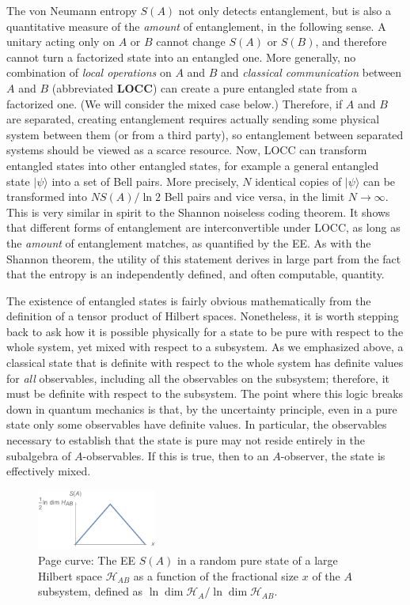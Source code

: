 \documentclass[11pt]{article}
\newcommand{\ket}[1]{|{#1}\rangle}
\newcommand{\HH}{\mathcal{H}}
\begin{document}
The von Neumann entropy $S(A)$ not only detects entanglement, but is also a quantitative measure of the \emph{amount} of entanglement, in the following sense. A unitary acting only on $A$ or $B$ cannot change $S(A)$ or $S(B)$, and therefore cannot turn a factorized state into an entangled one. More generally, no combination of \emph{local operations} on $A$ and $B$ and \emph{classical communication} between $A$ and $B$ (abbreviated \textbf{LOCC}) can create a pure entangled state from a factorized one. (We will consider the mixed case below.) Therefore, if $A$ and $B$ are separated, creating entanglement requires actually sending some physical system between them (or from a third party), so entanglement between separated systems should be viewed as a scarce resource. Now, LOCC can transform entangled states into other entangled states, for example a general entangled state $\ket{\psi}$ into a set of Bell pairs. More precisely, $N$ identical copies of $\ket{\psi}$ can be transformed into $NS(A)/\ln2$ Bell pairs and vice versa, in the limit $N\to\infty$. This is very similar in spirit to the Shannon noiseless coding theorem. It shows that different forms of entanglement are interconvertible under LOCC, as long as the \emph{amount} of entanglement matches, as quantified by the EE. As with the Shannon theorem, the utility of this statement derives in large part from the fact that the entropy is an independently defined, and often computable, quantity.

The existence of entangled states is fairly obvious mathematically from the definition of a tensor product of Hilbert spaces. Nonetheless, it is worth stepping back to ask how it is possible physically for a state to be pure with respect to the whole system, yet mixed with respect to a subsystem. As we emphasized above, a classical state that is definite with respect to the whole system has definite values for \emph{all} observables, including all the observables on the subsystem; therefore, it must be definite with respect to the subsystem. The point where this logic breaks down in quantum mechanics is that, by the uncertainty principle, even in a pure state only some observables have definite values. In particular, the observables necessary to establish that the state is pure may not reside entirely in the subalgebra of $A$-observables. If this is true, then to an $A$-observer, the state is effectively mixed.

\begin{figure}[tbp]
\centering
\includegraphics[width=0.35\textwidth]{figs/Page.pdf}
\caption{\label{fig:Page}
Page curve: The EE $S(A)$ in a random pure state of a large Hilbert space $\HH_{AB}$ as a function of the fractional size $x$ of the $A$ subsystem, defined as $\ln\dim\HH_A/\ln\dim\HH_{AB}$.
}
\end{figure}
\end{document}
